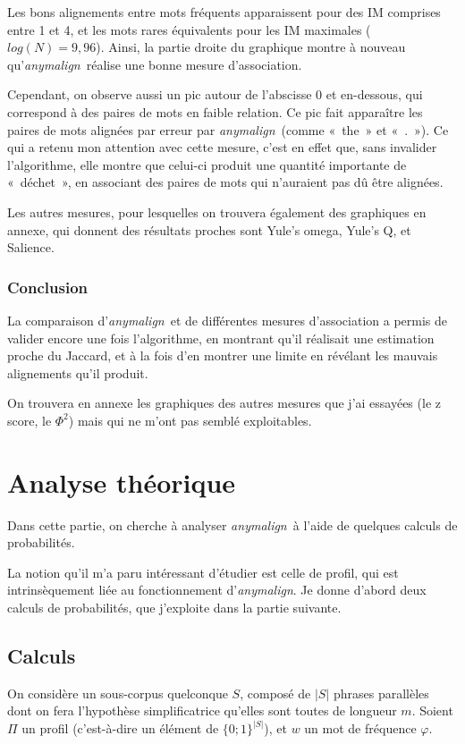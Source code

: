 \documentclass[a4paper,10pt]{article}
\newcommand{\anym}{\emph{anymalign}}
\newcommand{\guill}[1]{«~#1~»}
\begin{document}
Les bons alignements entre mots fréquents apparaissent pour des IM comprises entre 1 et 4, et les mots rares équivalents pour les IM maximales ($log(N)=9,96$). Ainsi, la partie droite du graphique montre à nouveau qu'\anym~réalise une bonne mesure d'association.

Cependant, on observe aussi un pic autour de l'abscisse 0 et en-dessous, qui correspond à des paires de mots en faible relation. Ce pic fait apparaître les paires de mots alignées par erreur par \anym~(comme \guill{the} et \guill{.}). Ce qui a retenu mon attention avec cette mesure, c'est en effet que, sans invalider l'algorithme, elle montre que celui-ci produit une quantité importante de \guill{déchet}, en associant des paires de mots qui n'auraient pas dû être alignées.

Les autres mesures, pour lesquelles on trouvera également des graphiques en annexe, qui donnent des résultats proches sont Yule's omega, Yule's Q, et Salience.

\subsubsection{Conclusion}

La comparaison d'\anym~et de différentes mesures d'association a permis de valider encore une fois l'algorithme, en montrant qu'il réalisait une estimation proche du Jaccard, et à la fois d'en montrer une limite en révélant les mauvais alignements qu'il produit.

On trouvera en annexe les graphiques des autres mesures que j'ai essayées (le z score, le $\Phi^2$) mais qui ne m'ont pas semblé exploitables.

\section{Analyse théorique}

Dans cette partie, on cherche à analyser \anym~à l'aide de quelques calculs de probabilités.

La notion qu'il m'a paru intéressant d'étudier est celle de profil, qui est intrinsèquement liée au fonctionnement d'\anym. Je donne d'abord deux calculs de probabilités, que j'exploite dans la partie suivante.

\subsection{Calculs}

On considère un sous-corpus quelconque $S$, composé de $|S|$ phrases parallèles dont on fera l'hypothèse simplificatrice qu'elles sont toutes de longueur $m$. Soient $\Pi$ un profil (c'est-à-dire un élément de $\{0;1\}^{|S|}$), et $w$ un mot de fréquence $\varphi$.
\end{document}
